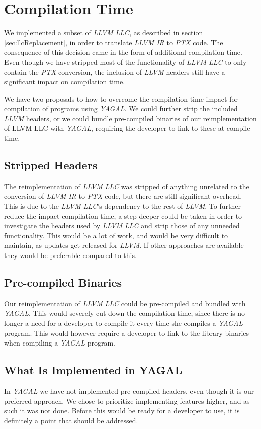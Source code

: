 \section{Compilation Time}

We implemented a subset of \textit{LLVM LLC}, as described in section \ref{sec:llcReplacement}, in order to translate \textit{LLVM IR} to \textit{PTX} code. The consequence of this decision came in the form of additional compilation time. Even though we have stripped most of the functionality of \textit{LLVM LLC} to only contain the \textit{PTX} conversion, the inclusion of \textit{LLVM} headers still have a significant impact on compilation time.

We have two proposals to how to overcome the compilation time impact for compilation of programs using \textit{YAGAL}. We could further strip the included \textit{LLVM} headers, or we could bundle pre-compiled binaries of our reimplementation of {LLVM LLC} with \textit{YAGAL}, requiring the developer to link to these at compile time.

\subsection{Stripped Headers}
The reimplementation of \textit{LLVM LLC} was stripped of anything unrelated to the conversion of \textit{LLVM IR} to \textit{PTX} code, but there are still significant overhead. This is due to the \textit{LLVM LLC}'s dependency to the rest of \textit{LLVM}. To further reduce the impact compilation time, a step deeper could be taken in order to investigate the headers used by \textit{LLVM LLC} and strip those of any unneeded functionality. This would be a lot of work, and would be very difficult to maintain, as updates get released for \textit{LLVM}. If other approaches are available they would be preferable compared to this.


\subsection{Pre-compiled Binaries}
Our reimplementation of \textit{LLVM LLC} could be pre-compiled and bundled with \textit{YAGAL}. This would severely cut down the compilation time, since there is no longer a need for a developer to compile it every time she compiles a \textit{YAGAL} program. This would however require a developer to link to the library binaries when compiling a \textit{YAGAL} program.

\subsection{What Is Implemented in YAGAL}
In \textit{YAGAL} we have not implemented pre-compiled headers, even though it is our preferred approach. We chose to prioritize implementing features higher, and as such it was not done. Before this would be ready for a developer to use, it is definitely a point that should be addressed.